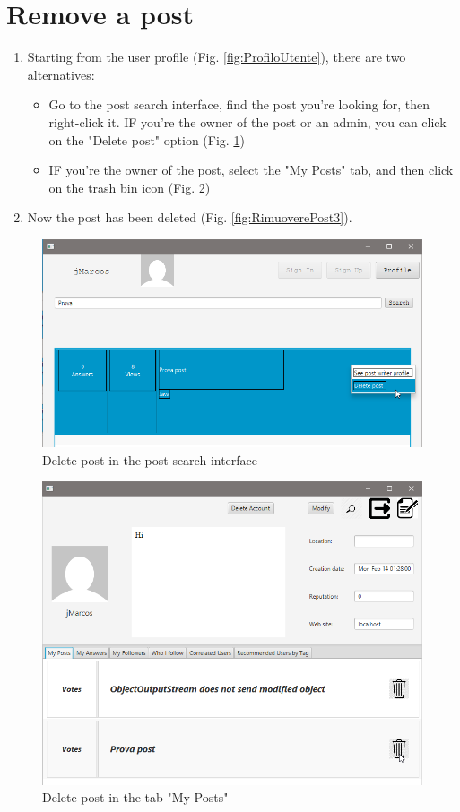 \documentclass[11pt]{report}
\begin{document}
\section{Remove a post}
\begin{enumerate}
    \item Starting from the user profile (Fig. \ref{fig:ProfiloUtente}), there are two alternatives:
    \begin{itemize}
        \item Go to the post search interface, find the post you're looking for, then right-click it. IF you're the owner of the post or an admin, you can click on the "Delete post" option (Fig. \ref{fig:RimuoverePost1})
        \item IF you're the owner of the post, select the "My Posts" tab, and then click on the trash bin icon (Fig. \ref{fig:RimuoverePost2})
    \end{itemize}
    \item Now the post has been deleted (Fig. \ref{fig:RimuoverePost3}).
\end{enumerate}
\begin{figure}[H]
  \centering
  \includegraphics[width=\textwidth,keepaspectratio=true]{img/user_manual/RimuoverePost1.png}
  \caption{Delete post in the post search interface}
  \label{fig:RimuoverePost1}
\end{figure}
\begin{figure}[H]
  \centering
  \includegraphics[width=\textwidth,keepaspectratio=true]{img/user_manual/RimuoverePost2.png}
  \caption{Delete post in the tab "My Posts"}
  \label{fig:RimuoverePost2}
\end{figure}
\end{document}
